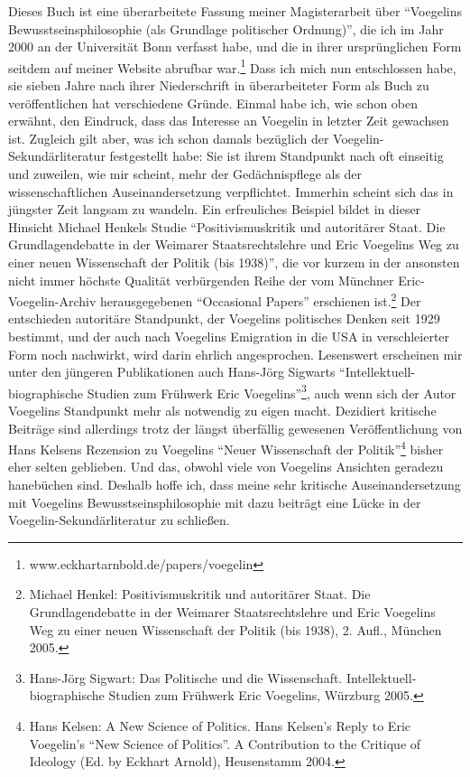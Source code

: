 Dieses Buch ist eine überarbeitete Fassung meiner Magisterarbeit über
``Voegelins Bewusstseinsphilosophie (als Grundlage politischer Ordnung)'', die
ich im Jahr 2000 an der Universität Bonn verfasst habe, und die in ihrer
ursprünglichen Form seitdem auf meiner Website abrufbar
war.\footnote{www.eckhartarnbold.de/papers/voegelin} Dass ich mich nun
entschlossen habe, sie sieben Jahre nach ihrer Niederschrift in
überarbeiteter Form als Buch zu veröffentlichen hat verschiedene Gründe.
Einmal habe ich, wie schon oben erwähnt, den Eindruck, dass das Interesse an
Voegelin in letzter Zeit gewachsen ist. Zugleich gilt aber, was ich schon
damals bezüglich der Voegelin-Sekundärliteratur festgestellt habe: Sie ist
ihrem Standpunkt nach oft einseitig und zuweilen, wie mir scheint,
mehr der Gedächnispflege als der wissenschaftlichen Auseinandersetzung
verpflichtet.  Immerhin scheint sich das in jüngster Zeit langsam zu wandeln.
Ein erfreuliches Beispiel bildet in dieser Hinsicht Michael Henkels Studie
``Positivismuskritik und autoritärer Staat. Die Grundlagendebatte in der
Weimarer Staatsrechtslehre und Eric Voegelins Weg zu einer neuen Wissenschaft
der Politik (bis 1938)'', die vor kurzem in der ansonsten nicht immer
höchste Qualität verbürgenden Reihe der vom Münchner Eric-Voegelin-Archiv
herausgegebenen "`Occasional Papers"' erschienen ist.\footnote{Michael Henkel:
  Positivismuskritik und autoritärer Staat. Die Grundlagendebatte in der
  Weimarer Staatsrechtslehre und Eric Voegelins Weg zu einer neuen
  Wissenschaft der Politik (bis 1938), 2. Aufl., München 2005.} Der entschieden
autoritäre Standpunkt, der Voegelins politisches Denken seit 1929 bestimmt,
und der auch nach Voegelins Emigration in die USA in verschleierter Form noch
nachwirkt, wird darin ehrlich angesprochen. Lesenswert erscheinen mir unter
den jüngeren Publikationen auch Hans-Jörg Sigwarts
``Intellektuell-biographische Studien zum Frühwerk Eric
Voegelins''\footnote{Hans-Jörg Sigwart: Das Politische und die Wissenschaft.
  Intellektuell-biographische Studien zum Frühwerk Eric Voegelins, Würzburg
  2005.}, auch wenn sich der Autor Voegelins Standpunkt mehr als notwendig zu
eigen macht. Dezidiert kritische Beiträge sind allerdings trotz der längst
überfällig gewesenen Veröffentlichung von Hans Kelsens Rezension zu Voegelins
``Neuer Wissenschaft der Politik''\footnote{Hans Kelsen: A New Science of
  Politics. Hans Kelsen's Reply to Eric Voegelin's "`New Science of
  Politics"'. A Contribution to the Critique of Ideology (Ed. by Eckhart
  Arnold), Heusenstamm 2004.} bisher eher selten geblieben. Und das, obwohl
viele von Voegelins Ansichten geradezu hanebüchen sind. Deshalb hoffe ich,
dass meine sehr kritische Auseinandersetzung mit Voegelins
Bewusstseinsphilosophie mit dazu beiträgt eine Lücke in der
Voegelin-Sekundärliteratur zu schließen.

